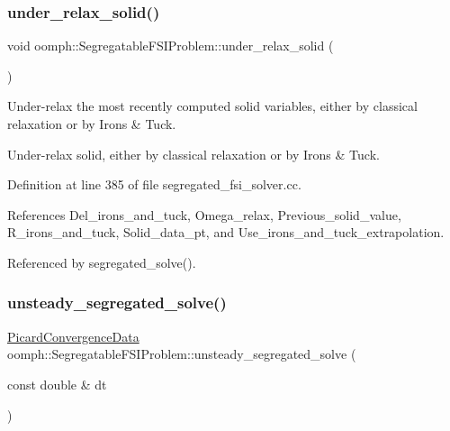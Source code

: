 \subsubsection{\texorpdfstring{under\+\_\+relax\+\_\+solid()}{under\_relax\_solid()}}
{\footnotesize\ttfamily void oomph\+::\+Segregatable\+F\+S\+I\+Problem\+::under\+\_\+relax\+\_\+solid (\begin{DoxyParamCaption}{ }\end{DoxyParamCaption})\hspace{0.3cm}{\ttfamily [private]}}



Under-\/relax the most recently computed solid variables, either by classical relaxation or by Irons \& Tuck. 

Under-\/relax solid, either by classical relaxation or by Irons \& Tuck. 

Definition at line 385 of file segregated\+\_\+fsi\+\_\+solver.\+cc.



References Del\+\_\+irons\+\_\+and\+\_\+tuck, Omega\+\_\+relax, Previous\+\_\+solid\+\_\+value, R\+\_\+irons\+\_\+and\+\_\+tuck, Solid\+\_\+data\+\_\+pt, and Use\+\_\+irons\+\_\+and\+\_\+tuck\+\_\+extrapolation.



Referenced by segregated\+\_\+solve().

\mbox{\label{classoomph_1_1SegregatableFSIProblem_aae43b43dbc197d238535bcb5c3acf168}} 
\subsubsection{\texorpdfstring{unsteady\+\_\+segregated\+\_\+solve()}{unsteady\_segregated\_solve()}\hspace{0.1cm}{\footnotesize\ttfamily [1/2]}}
{\footnotesize\ttfamily \hyperlink{classoomph_1_1PicardConvergenceData}{Picard\+Convergence\+Data} oomph\+::\+Segregatable\+F\+S\+I\+Problem\+::unsteady\+\_\+segregated\+\_\+solve (\begin{DoxyParamCaption}\item[{const double \&}]{dt }\end{DoxyParamCaption})}



